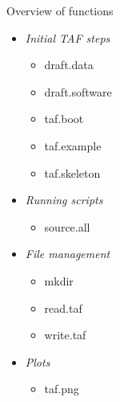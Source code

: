 \documentclass[aspectratio=169]{beamer}
\begin{document}

\begin{frame}{Overview of functions}\small
  \begin{itemize}
    \item[] {\it Initial TAF steps}\\
    \begin{itemize}\tt\blue\fns
      \item[] draft.data
      \item[] draft.software
      \item[] taf.boot
      \item[] taf.example
      \item[] taf.skeleton\\[2ex]
    \end{itemize}
    \item[] {\it Running scripts}\\
    \begin{itemize}\tt\blue\fns
      \item[] source.all\\[2ex]
    \end{itemize}
    \item[] {\it File management}\\
    \begin{itemize}\tt\blue\fns
      \item[] mkdir
      \item[] read.taf
      \item[] write.taf\\[2ex]
    \end{itemize}
    \item[] {\it Plots}\\
    \begin{itemize}\tt\blue\fns
      \item[] taf.png\\[4ex]
    \end{itemize}
  \end{itemize}
\end{frame}

\end{document}
